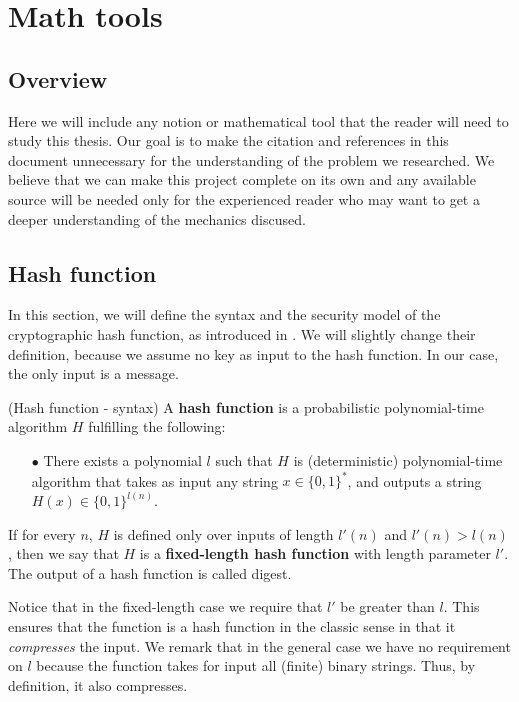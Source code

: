 \chapter{Math tools} \label{ch:math}
%
\section{Overview}
Here we will include any notion or mathematical tool that the reader will need to study this thesis. Our goal is to make the citation and references in this document unnecessary for the understanding of the problem we researched. We believe that we can make this project complete on its own and any available source will be needed only for the experienced reader who may want to get a deeper understanding of the mechanics discused.
%
\section{Hash function}
%
In this section, we will define the syntax and the security model of the cryptographic hash function, as introduced in \cite{Katz:2007:IMC:1206501}. We will slightly change their definition, because we assume no key as input to the hash function. In our case, the only input is a message.
%
\begin{definition}{(Hash function - syntax)} \textnormal{\cite{Katz:2007:IMC:1206501}}
A \textbf{hash function} is a probabilistic polynomial-time algorithm $H$
fulfilling the following:
\begin{itemize}
  \item[$\bullet$] There exists a polynomial $l$ such that $H$ is (deterministic) polynomial-time
  algorithm that takes as input any string $x \in { \{ 0,1 \}}^*$, and outputs
  a string $H(x) \in { \{ 0,1 \}}^{l(n)}$.
\end{itemize}
If for every $n$, $H$ is defined only over inputs of length $l'(n)$ and $l'(n) > l(n)$, then
we say that $H$ is a \textbf{fixed-length hash function} with length parameter $l'$. The output of a hash function is called digest.
\end{definition}

Notice that in the fixed-length case we require that $l'$ be greater than $l$. This ensures that the
function is a hash function in the classic sense in that it \textit{compresses} the input. We remark
that in the general case we have no requirement on $l$ because the function takes for input all (finite) binary strings. Thus, by definition, it also compresses.

